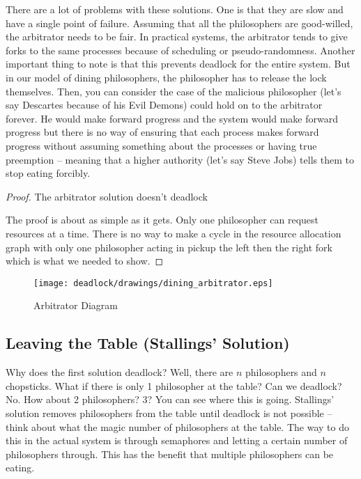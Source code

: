 There are a lot of problems with these solutions.
One is that they are slow and have a single point of failure.
Assuming that all the philosophers are good-willed, the arbitrator needs to be fair.
In practical systems, the arbitrator tends to give forks to the same processes because of scheduling or pseudo-randomness.
Another important thing to note is that this prevents deadlock for the entire system.
But in our model of dining philosophers, the philosopher has to release the lock themselves.
Then, you can consider the case of the malicious philosopher (let's say Descartes because of his Evil Demons) could hold on to the arbitrator forever.
He would make forward progress and the system would make forward progress but there is no way of ensuring that each process makes forward progress without assuming something about the processes or having true preemption -- meaning that a higher authority (let's say Steve Jobs) tells them to stop eating forcibly.


\begin{proof} The arbitrator solution doesn't deadlock

The proof is about as simple as it gets. Only one philosopher can request resources at a time. There is no way to make a cycle in the resource allocation graph with only one philosopher acting in pickup the left then the right fork which is what we needed to show.

\end{proof}

\begin{figure}[H]
\centering
\texttt{[image: deadlock/drawings/dining\_arbitrator.eps]}
\caption{Arbitrator Diagram}
\end{figure}

\subsection{Leaving the Table (Stallings' Solution)}

Why does the first solution deadlock?
Well, there are $n$ philosophers and $n$ chopsticks.
What if there is only 1 philosopher at the table?
Can we deadlock?
No.
How about 2 philosophers?
3?
You can see where this is going.
Stallings' \cite[P. 280]{stalling} solution removes philosophers from the table until deadlock is not possible -- think about what the magic number of philosophers at the table.
The way to do this in the actual system is through semaphores and letting a certain number of philosophers through.
This has the benefit that multiple philosophers can be eating.

